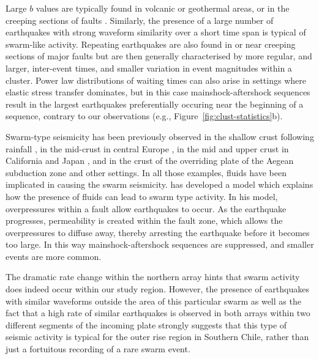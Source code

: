 \documentclass[reviewcopy]{elsarticle}
\begin{document}
Large $b$ values are typically found in volcanic or geothermal areas, or in
the creeping sections of faults \citep{wiemer02}.
Similarly, the presence of a large number of earthquakes with strong
waveform similarity over a short time span is typical of
swarm-like activity.  Repeating earthquakes are also found in or near creeping
sections of major faults \citep[e.g.][]{nadeau98} but are then
generally characterised by more regular, and larger, inter-event
times, and smaller variation in event magnitudes within a
cluster. Power law distributions of waiting times can also
arise in settings where elastic stress transfer dominates, but in this
case mainshock-aftershock sequences result in the largest earthquakes
preferentially occuring near the beginning of a sequence, contrary to
our observations (e.g., Figure~\ref{fig:clust-statistics}b).

Swarm-type seismicity has been
previously observed in the shallow crust following rainfall
\citep{kraft06}, in the mid-crust in central Europe \citep{spicak01}, in
the mid and upper crust in California and Japan \citep{vidale06}, and
in the crust of the overriding plate of the Aegean subduction zone
\citep{becker06} and other settings.  In all those examples,  fluids
have been implicated in causing the swarm seismicity.
  \citet{yamashita99} has developed a model which
explains how the presence of fluids can lead to swarm type activity.
In his model, overpressures within a fault allow earthquakes to
occur.  As the earthquake progresses, permeability is created within the
fault zone, which allows the overpressures to diffuse away, thereby
arresting the earthquake before it becomes too large.  In this way
mainshock-aftershock sequences are suppressed, and smaller events are
more common.

The dramatic rate change within the northern array hints that swarm
activity does indeed occur within our study region. However, the presence of
 earthquakes with similar waveforms outside the area of this particular swarm as well
as the fact that a high rate of similar earthquakes is observed in
 both arrays within two different segments of the incoming plate
strongly suggests that this type of seismic activity is typical for
the outer rise region in Southern Chile, rather than just a fortuitous
recording of a rare swarm event.
\end{document}
